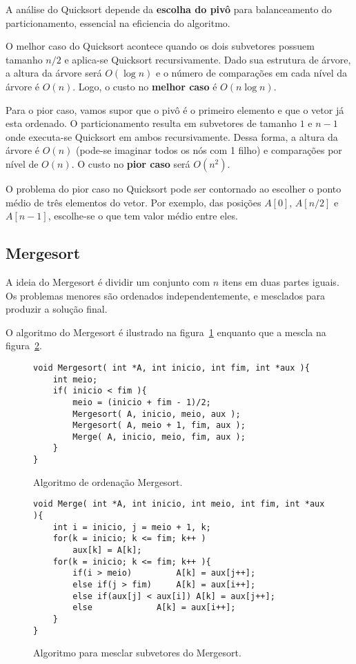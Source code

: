 A análise do Quicksort depende da {\bf escolha do pivô} para balanceamento do
particionamento, essencial na eficiencia do algoritmo.

O melhor caso do Quicksort acontece quando os dois subvetores possuem tamanho
$n/2$ e aplica-se Quicksort recursivamente.
Dado sua estrutura de árvore, a altura da árvore será $O(\log n)$ e o número
de comparações em cada nível da árvore é $O(n)$. 
Logo, o custo no {\bf melhor caso} é $O(n \log n)$.

Para o pior caso, vamos supor que o pivô é o primeiro elemento e que o vetor já esta 
ordenado.  
O particionamento resulta em subvetores de tamanho $1$ e $n-1$ onde executa-se Quicksort
em ambos recursivamente.
Dessa forma, a altura da árvore é $O(n)$ (pode-se imaginar todos os nós com 1 filho)
e comparações por nível de $O(n)$.
O custo no {\bf pior caso} será $O(n^2)$.

O problema do pior caso no Quicksort pode ser contornado ao escolher o ponto médio
de três elementos do vetor.
Por exemplo, das posições $A[0]$, $A[n/2]$ e $A[n-1]$, escolhe-se o que tem
valor médio entre eles.

\subsection{Mergesort}

A ideia do Mergesort é dividir um conjunto com $n$ itens em duas partes iguais.
Os problemas menores são ordenados independentemente, e mesclados para
produzir a solução final.

O algoritmo do Mergesort é ilustrado na figura~\ref{aula03:algo:mergesort}
enquanto que a mescla na figura~\ref{aula03:algo:merge}.
%
\begin{figure}[!htb]
\centering
\begin{framed}
\begin{lstlisting}
void Mergesort( int *A, int inicio, int fim, int *aux ){
	int meio;
	if( inicio < fim ){
		meio = (inicio + fim - 1)/2;
		Mergesort( A, inicio, meio, aux );
		Mergesort( A, meio + 1, fim, aux );
		Merge( A, inicio, meio, fim, aux );
	}
}
\end{lstlisting}
\end{framed}
\caption{Algoritmo de ordenação Mergesort.}
\label{aula03:algo:mergesort}
\end{figure}

\begin{figure}[!htb]
\centering
\begin{framed}
\begin{lstlisting}
void Merge( int *A, int inicio, int meio, int fim, int *aux ){
	int i = inicio, j = meio + 1, k;
	for(k = inicio; k <= fim; k++ )
		aux[k] = A[k];
	for(k = inicio; k <= fim; k++ ){
		if(i > meio)		 A[k] = aux[j++];
		else if(j > fim)	 A[k] = aux[i++];
		else if(aux[j] < aux[i]) A[k] = aux[j++];
		else 			 A[k] = aux[i++];
	}
}
\end{lstlisting}
\end{framed}
\caption{Algoritmo para mesclar subvetores do Mergesort.}
\label{aula03:algo:merge}
\end{figure}

